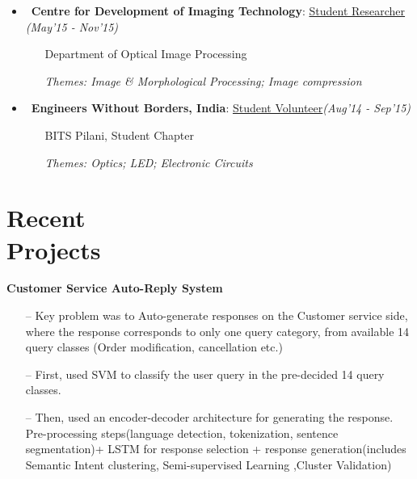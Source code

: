 \documentclass[margin,line]{templates/resume}
\newcommand{\myhref}[3][blue]{\href{#2}{\color{#1}{#3}}}
\newcommand{\compresslist}{%
\setlength{\itemsep}{3pt}%
\setlength{\parskip}{0pt}%
\setlength{\parsep}{0pt}%
}
\begin{document}
\begin{resume}
\begin{itemize}[leftmargin = 0.7cm]
\item~\textbf{Centre for Development of Imaging Technology}: \href{http://www.cdit.org/}{Student Researcher} \hfill{\small\textit{(May'15 - Nov'15)}}
\vspace{-1mm}
\begin{itemize}[leftmargin=*]\compresslist
      \item[]\small Department of Optical Image Processing\vspace{-1mm}
        \item[]\small\textit{Themes:  Image \& Morphological Processing; Image compression}
    \end{itemize}
\item~\textbf{Engineers Without Borders, India}: {\href{http://www.ewb-india.org/}{Student Volunteer}}\hfill{\small\textit{(Aug'14 - Sep'15)}}
\vspace{-1mm}
\begin{itemize}[leftmargin=*]\compresslist
       \item[]\small BITS Pilani, Student Chapter\vspace{-1mm}
        \item[]\small\textit{Themes: Optics; LED; Electronic Circuits}
    \end{itemize}
    \end{itemize}
\vspace{-0.1cm}
\section{\mysidestyle Recent\\Projects}
\textsf{\textbf{Customer Service Auto-Reply System}} \hfill{\myhref[darkblue]{https://esha-singh.github.io/\#mpi}{Web}}
\vspace{0.05cm}
\begin{itemize}[leftmargin=*]\compresslist
 \item[--] Key problem was to Auto-generate responses on the Customer service side, where the response corresponds to only one query category, from available 14 query classes (Order modification, cancellation etc.) 
 \item[--] First, used SVM to classify the user query in the pre-decided 14 query classes.
 \item[--] Then, used an encoder-decoder architecture for generating the response. Pre-processing steps(language detection, tokenization, sentence segmentation)+ LSTM for response selection + response generation(includes Semantic Intent clustering, Semi-supervised Learning ,Cluster Validation)
\vspace{0.05cm}  
\end{itemize}


\end{resume}
\end{document}
